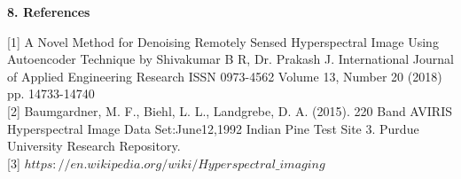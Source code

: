 \documentclass{article}
\begin{document}
\begin{flushleft}
\textbf{\large 8. References}
\end{flushleft}

[1] A Novel Method for Denoising Remotely Sensed Hyperspectral Image Using Autoencoder Technique by Shivakumar B R, Dr. Prakash J. International Journal of Applied Engineering Research ISSN 0973-4562 Volume 13, Number 20 (2018) pp. 14733-14740\\

[2] Baumgardner, M. F., Biehl, L. L., Landgrebe, D. A. (2015). 220 Band AVIRIS Hyperspectral Image Data Set:June12,1992 Indian Pine Test Site 3. Purdue University Research Repository.\\

[3] $https://en.wikipedia.org/wiki/Hyperspectral\_imaging$
\end{document}
